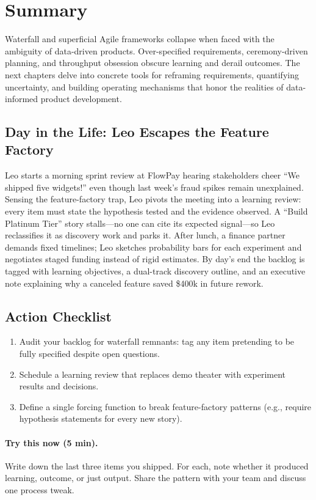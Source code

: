 \section{Summary}
\label{sec:failures-summary}

Waterfall and superficial Agile frameworks collapse when faced with the ambiguity of data-driven products. Over-specified requirements, ceremony-driven planning, and throughput obsession obscure learning and derail outcomes. The next chapters delve into concrete tools for reframing requirements, quantifying uncertainty, and building operating mechanisms that honor the realities of data-informed product development.

\subsection{Day in the Life: Leo Escapes the Feature Factory}
Leo starts a morning sprint review at FlowPay hearing stakeholders cheer ``We shipped five widgets!'' even though last week's fraud spikes remain unexplained. Sensing the feature-factory trap, Leo pivots the meeting into a learning review: every item must state the hypothesis tested and the evidence observed. A ``Build Platinum Tier'' story stalls—no one can cite its expected signal—so Leo reclassifies it as discovery work and parks it. After lunch, a finance partner demands fixed timelines; Leo sketches probability bars for each experiment and negotiates staged funding instead of rigid estimates. By day’s end the backlog is tagged with learning objectives, a dual-track discovery outline, and an executive note explaining why a canceled feature saved \$400k in future rework.

\subsection{Action Checklist}
\begin{enumerate}
    \item Audit your backlog for waterfall remnants: tag any item pretending to be fully specified despite open questions.
    \item Schedule a learning review that replaces demo theater with experiment results and decisions.
    \item Define a single forcing function to break feature-factory patterns (e.g., require hypothesis statements for every new story).
\end{enumerate}

\paragraph{Try this now (5 min).} Write down the last three items you shipped. For each, note whether it produced learning, outcome, or just output. Share the pattern with your team and discuss one process tweak.

